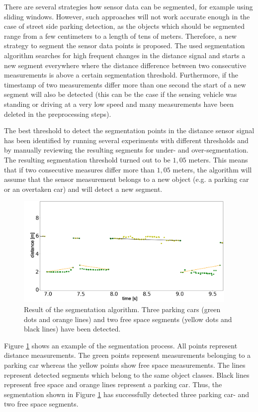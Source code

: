 There are several strategies how sensor data can be segmented, for example using sliding windows. However, such approaches will not work accurate enough in the case of street side parking detection, as the objects which should be segmented range from a few centimeters to a length of tens of meters. Therefore, a new strategy to segment the sensor data points is proposed. The used segmentation algorithm searches for high frequent changes in the distance signal and starts a new segment everywhere where the distance difference between two consecutive measurements is above a certain segmentation threshold. Furthermore, if the timestamp of two measurements differ more than one second the start of a new segment will also be detected (this can be the case if the sensing vehicle was standing or driving at a very low speed and many measurements have been deleted in the preprocessing steps). 

The best threshold to detect the segmentation points in the distance sensor signal has been identified by running several experiments with different thresholds and by manually reviewing the resulting segments for under- and over-segmentation. The resulting segmentation threshold turned out to be $1,05$ meters. This means that if two consecutive measures differ more than $1,05$ meters, the algorithm will assume that the sensor measurement belongs to a new object (e.g. a parking car or an overtaken car) and will detect a new segment.

\begin{figure}
	\centering
	\includegraphics[width=0.95\textwidth]{img/segmentation_example.PNG}
	\caption{Result of the segmentation algorithm. Three parking cars (green dots and orange lines) and two free space segments (yellow dots and black lines) have been detected.}
	\label{fig:segmentation}
\end{figure}

Figure \ref{fig:segmentation} shows an example of the segmentation process. All points represent distance measurements. The green points represent measurements belonging to a parking car whereas the yellow points show free space measurements. The lines represent detected segments which belong to the same object classes. Black lines represent free space and orange lines represent a parking car. Thus, the segmentation shown in Figure \ref{fig:segmentation} has successfully detected three parking car- and two free space segments. 

